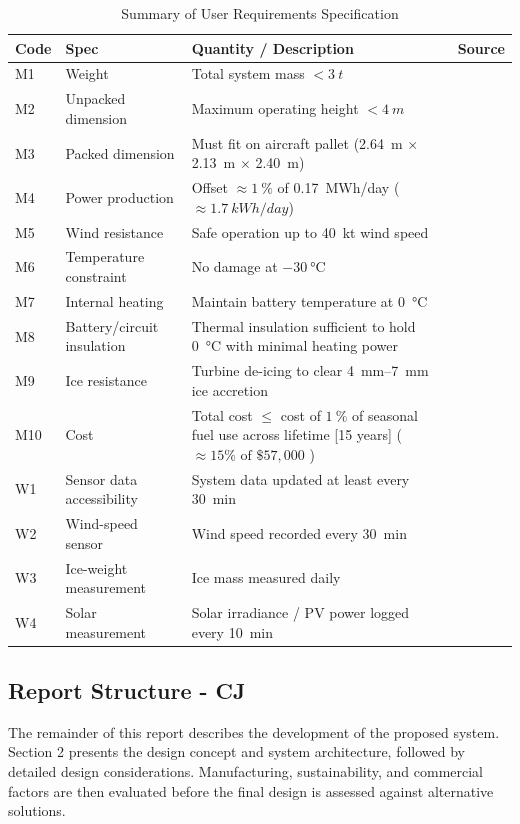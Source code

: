 \documentclass[11pt,a4paper]{article}
\begin{document}
\begin{table}[H]
  \centering
  \caption{Summary of User Requirements Specification}
  \label{tab:URS}
  \begin{tabular}{llp{7cm}l}
    \toprule
    Code & Spec & Quantity / Description & Source \\ \midrule
    M1 & Weight & Total system mass $< \SI{3}{t}$ & \cite{Weight} \\
    M2 & Unpacked dimension & Maximum operating height $< \SI{4}{m}$ & \cite{Power Production} \\
    M3 & Packed dimension & Must fit on aircraft pallet
          (\SI{2.64}{m} $\times$ \SI{2.13}{m} $\times$ \SI{2.40}{m}) & \cite{Packed Dimensions} \\
    M4 & Power production & Offset $\approx 1~\%$ of \SI{0.17}{MWh/day}
         ($\approx\SI{1.7}{kWh/day}$) & \cite{Power Production} \\
    M5 & Wind resistance & Safe operation up to \SI{40}{kt} wind speed & \cite{Weather} \\
    M6 & Temperature constraint & No damage at \(-\SI{30}{\celsius}\) & \cite{Weather} \\
    M7 & Internal heating & Maintain battery temperature at \SI{0}{\celsius} & \cite{Internal Heating} \\
    M8 & Battery/circuit insulation & Thermal insulation sufficient to
         hold \SI{0}{\celsius} with minimal heating power & \cite{Battery Final} \\
    M9 & Ice resistance & Turbine de-icing to clear \SIrange{4}{7}{mm}
         ice accretion & \cite{Weather} \\
    M10 & Cost & Total cost $\leq$ cost of \(1~\%\) of seasonal fuel use across lifetime [15 years]
           ($\approx 15\% \text{ of } \$57{,}000$
)& \cite{Fuel Price} \cite{Fuel usage} \\
    W1 & Sensor data accessibility & System data updated at least every 30~min & \\
    W2 & Wind-speed sensor & Wind speed recorded every 30~min &  \\
    W3 & Ice-weight measurement & Ice mass measured daily &  \\
    W4 & Solar measurement & Solar irradiance / PV power logged every 10~min & \\
    \bottomrule
  \end{tabular}
\end{table}

\subsection{Report Structure - CJ}
The remainder of this report describes the development of the proposed system. Section 2 presents the design concept and system architecture, followed by detailed design considerations. Manufacturing, sustainability, and commercial factors are then evaluated before the final design is assessed against alternative solutions.
\end{document}
